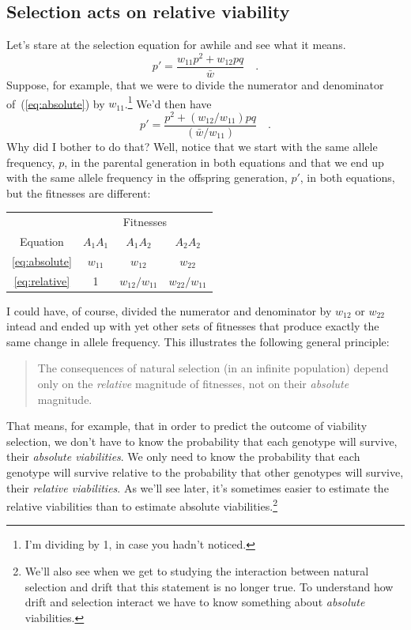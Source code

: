 \subsection*{Selection acts on relative viability}

Let's stare at the selection equation for awhile and see what it
means.
\begin{equation}
p' = \frac{w_{11}p^2 + w_{12}pq}{\bar w} \quad . \label{eq:absolute}
\end{equation}
Suppose, for example, that we were to divide the numerator and
denominator of~(\ref{eq:absolute}) by $w_{11}$.\footnote{I'm dividing
  by 1, in case you hadn't noticed.} We'd then have
\begin{equation}
p' = \frac{p^2 + (w_{12}/w_{11})pq}{(\bar w/w_{11})} \quad . \label{eq:relative}
\end{equation}
Why did I bother to do that? Well, notice that we start with the same
allele frequency, $p$, in the parental generation in both equations
and that we end up with the same allele frequency in the offspring
generation, $p'$, in both equations, but the fitnesses are different:
\begin{center}
\begin{tabular}{c|ccc}
\hline\hline
         & \multicolumn{3}{c}{Fitnesses} \\
Equation & $A_1A_1$ & $A_1A_2$ & $A_2A_2$ \\
\hline
\ref{eq:absolute} & $w_{11}$ & $w_{12}$ & $w_{22}$ \\
\ref{eq:relative} & 1 & $w_{12}/w_{11}$ & $w_{22}/w_{11}$ \\
\hline
\end{tabular}
\end{center}
I could have, of course, divided the numerator and denominator by
$w_{12}$ or $w_{22}$ intead and ended up with yet other sets of
fitnesses that produce exactly the same change in allele
frequency. This illustrates the following general principle:
\begin{quote}
The consequences of natural selection (in an infinite population)
depend only on the {\it relative\/} magnitude of fitnesses, not on
their {\it absolute\/} magnitude.
\end{quote}
That means, for example, that in order to predict the outcome of
viability selection, we don't have to know the probability that each
genotype will survive, their {\it absolute viabilities}. We only need
to know the probability that each genotype will survive relative to
the probability that other genotypes will survive, their {\it relative
  viabilities}. As we'll see later, it's sometimes easier to estimate
the relative viabilities than to estimate absolute
viabilities.\footnote{We'll also see when we get to studying the
  interaction between natural selection and drift that this statement
  is no longer true. To understand how drift and selection interact we
  have to know something about {\it absolute\/} viabilities.}

